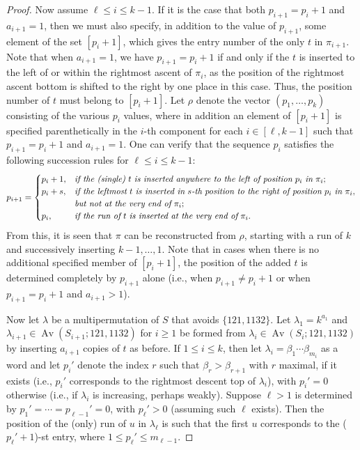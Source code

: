 \documentclass[11pt]{amsart}
\theoremstyle{plain}
\theoremstyle{definition}
\DeclareMathOperator{\Av}{Av}
\begin{document}
\begin{proof}
Now assume $\ell \leq i \leq k-1$.  If it is the case that both $p_{i+1}=p_{i}+1$ and $a_{i+1}=1$, then we  must also specify, in addition to the value of $p_{i+1}$, some element of the set $[p_{i}+1]$, which gives the entry number of the only $t$ in $\pi_{i+1}$.  Note that when $a_{i+1}=1$, we have $p_{i+1}=p_i+1$ if and only if the $t$ is inserted to the left of or within the rightmost ascent of $\pi_i$, as the position of the rightmost ascent bottom is shifted to the right by one place in this case.  Thus, the position number of $t$ must belong to $[p_i+1]$. Let $\rho$ denote the vector $(p_1,\ldots,p_k)$ consisting of the various $p_i$ values, where in addition an element of $[p_{i}+1]$ is specified parenthetically in the $i$-th component for each $i \in [\ell,k-1]$ such that $p_{i+1}=p_{i}+1$ and $a_{i+1}=1$.  One can verify that the sequence $p_{i}$ satisfies the following succession rules for $\ell  \leq i \leq k-1$:
$$p_{i+1}=\begin{cases}
{\displaystyle p_{i}+1}, &\emph{if~the~(single)}~t~\emph{is~inserted anywhere to the left of position}~p_{i}~\emph{in}~\pi_{i};\\
{\displaystyle p_{i}+s}, &\emph{if~the~leftmost}~t~\emph{is~inserted~in}~s\emph{-th}~\emph{position~to~the~right~of~position}~p_{i}~\emph{in}~\pi_{i},\\
{\displaystyle ~} &\emph{but~not~at the~very~end~of}~\pi_{i};\\
{\displaystyle p_{i}},  &\emph{if~the~run~of}~t~\emph{is~inserted~at~the~very~end~of}~\pi_{i}.
\end{cases}$$
From this, it is seen
that $\pi$ can be reconstructed from $\rho$, starting with a run of  $k$ and successively
inserting $k-1,\ldots,1$.  Note that in cases when there is no additional specified member of
$[p_{i}+1]$, the position of the added $t$ is determined completely by $p_{i+1}$ alone (i.e., when
$p_{i+1}\neq p_{i}+1$ or when $p_{i+1}=p_{i}+1$ and $a_{i+1}>1$).

Now let $\lambda$ be a multipermutation of $S$ that avoids $\{121,1132\}$.
Let $\lambda_1=k^{a_1}$ and $\lambda_{i+1}\in \Av(S_{i+1};121,1132)$ for $i\geq1$ be formed from
$\lambda_{i}\in \Av(S_{i};121,1132)$ by inserting $a_{i+1}$ copies of $t$ as before. If $1 \leq i
\leq k$, then let $\lambda_i=\beta_1\cdots \beta_{m_i}$ as a word and let $p_i'$ denote the index $r$
such that $\beta_r>\beta_{r+1}$ with $r$ maximal, if it exists (i.e., $p_i'$ corresponds to the
rightmost descent top of $\lambda_i$), with $p_i'=0$ otherwise (i.e., if $\lambda_i$ is increasing,
perhaps weakly).  Suppose $\ell>1$ is determined by $p_1'=\cdots=p_{\ell-1}'=0$, with $p_\ell'>0$
(assuming such $\ell$ exists).  Then the position of the (only) run of $u$ in $\lambda_\ell$ is
such that the first $u$ corresponds to the ($p_{\ell}'+1$)-st entry, where $1 \leq p_\ell' \leq
m_{\ell-1}$.


\end{proof}
\end{document}
